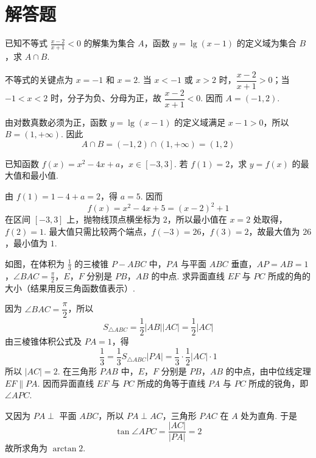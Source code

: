 \section{解答题}

\begin{problem}
已知不等式 \(\frac{x-2}{x+1}<0\) 的解集为集合 \(A\)，函数 \(y=\lg(x-1)\) 的定义域为集合 \(B\)，求 \(A\cap B\).
\end{problem}

\begin{solution}
不等式的关键点为 \(x=-1\) 和 \(x=2\). 当 \(x<-1\) 或 \(x>2\) 时，\(\dfrac{x-2}{x+1}>0\)；当 \(-1<x<2\) 时，分子为负、分母为正，故 \(\dfrac{x-2}{x+1}<0\). 因而 \(A=(-1,2)\).

由对数真数必须为正，函数 \(y=\lg(x-1)\) 的定义域满足 \(x-1>0\)，所以 \(B=(1,+\infty)\). 因此
\[
A\cap B=(-1,2)\cap(1,+\infty)=(1,2)
\]
\end{solution}

\begin{problem}
已知函数 \(f(x)=x^{2}-4x+a\)，\(x\in[-3,3]\). 若 \(f(1)=2\)，求 \(y=f(x)\) 的最大值和最小值.
\end{problem}

\begin{solution}
由 \(f(1)=1-4+a=2\)，得 \(a=5\). 因而
\[
f(x)=x^2-4x+5=(x-2)^2+1
\]
在区间 \([-3,3]\) 上，抛物线顶点横坐标为 \(2\)，所以最小值在 \(x=2\) 处取得，\(f(2)=1\). 最大值只需比较两个端点，\(f(-3)=26\)，\(f(3)=2\)，故最大值为 \(26\)，最小值为 \(1\).
\end{solution}

\begin{problem}
如图，在体积为 \(\frac{1}{3}\) 的三棱锥 \(P-ABC\) 中，\(PA\) 与平面 \(ABC\) 垂直，\(AP=AB=1\)，\(\angle BAC=\frac{\pi}{2}\)，\(E\)，\(F\) 分别是 \(PB\)，\(AB\) 的中点. 求异面直线 \(EF\) 与 \(PC\) 所成的角的大小（结果用反三角函数值表示）.

\end{problem}

\begin{solution}
因为 \(\angle BAC=\dfrac{\pi}{2}\)，所以
\[
S_{\triangle ABC}=\frac12|AB||AC|=\frac12|AC|
\]
由三棱锥体积公式及 \(PA=1\)，得
\[
\frac13=\frac13S_{\triangle ABC}|PA|=\frac13\cdot\frac12|AC|\cdot1
\]
所以 \(|AC|=2\). 在三角形 \(PAB\) 中，\(E\)，\(F\) 分别是 \(PB\)，\(AB\) 的中点，由中位线定理 \(EF\parallel PA\). 因而异面直线 \(EF\) 与 \(PC\) 所成的角等于直线 \(PA\) 与 \(PC\) 所成的锐角，即 \(\angle APC\).

又因为 \(PA\perp\) 平面 \(ABC\)，所以 \(PA\perp AC\)，三角形 \(PAC\) 在 \(A\) 处为直角. 于是
\[
\tan\angle APC=\frac{|AC|}{|PA|}=2
\]
故所求角为 \(\arctan 2\).
\end{solution}

